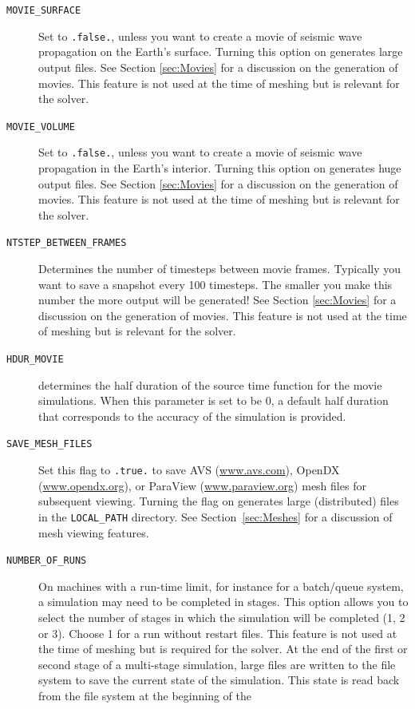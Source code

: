 \documentclass[oneside,english]{book}
\newcommand{\urlwithparentheses}[1]{(\url{#1})}
\begin{document}
\begin{description}
\item [{\texttt{MOVIE\_SURFACE}}] Set to \texttt{.false.}, unless you want
to create a movie of seismic wave propagation on the Earth's surface.
Turning this option on generates large output files. See Section \ref{sec:Movies}
for a discussion on the generation of movies. This feature is not
used at the time of meshing but is relevant for the solver.
\item [{\texttt{MOVIE\_VOLUME}}] Set to \texttt{.false.}, unless you want
to create a movie of seismic wave propagation in the Earth's interior.
Turning this option on generates huge output files. See Section \ref{sec:Movies}
for a discussion on the generation of movies. This feature is not
used at the time of meshing but is relevant for the solver.
\item [{\texttt{NTSTEP\_BETWEEN\_FRAMES}}] Determines the number of timesteps
between movie frames. Typically you want to save a snapshot every
100 timesteps. The smaller you make this number the more output will
be generated! See Section \ref{sec:Movies} for a discussion on the
generation of movies. This feature is not used at the time of meshing
but is relevant for the solver.
\item [{\texttt{HDUR\_MOVIE}}] determines the half duration of the source
time function for the movie simulations. When this parameter is set
to be 0, a default half duration that corresponds to the accuracy
of the simulation is provided.
\item [{\texttt{SAVE\_MESH\_FILES}}] Set this flag to \texttt{.true}\texttt{\small .}
to save AVS \urlwithparentheses{www.avs.com}, OpenDX \urlwithparentheses{www.opendx.org}, or ParaView \urlwithparentheses{www.paraview.org}
mesh files for subsequent viewing. Turning the flag on generates large
(distributed) files in the \texttt{LOCAL\_PATH} directory. See Section~\ref{sec:Meshes}
for a discussion of mesh viewing features.
\item [{\texttt{NUMBER\_OF\_RUNS}}] On machines with a run-time limit,
for instance for a batch/queue system, a simulation may need to be
completed in stages. This option allows you to select the number of
stages in which the simulation will be completed (1, 2 or 3). Choose
1 for a run without restart files. This feature is not used at the
time of meshing but is required for the solver. At the end of the
first or second stage of a multi-stage simulation, large files are
written to the file system to save the current state of the simulation.
This state is read back from the file system at the beginning of the

\end{description}
\end{document}
